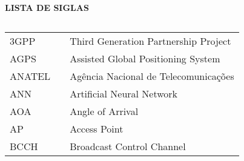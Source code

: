 \newpage

\begin{center}
\textbf{LISTA DE SIGLAS}
\end{center}
$\!$\\

\begin{tabular}{lll}
3GPP & \hspace{1cm} & Third Generation Partnership Project \\
AGPS &  \hspace{1cm} & Assisted Global Positioning System \\
ANATEL &  \hspace{1cm} & Agência Nacional de Telecomunicações \\
ANN & \hspace{1cm} & Artificial Neural Network \\
AOA&  \hspace{1cm} &Angle of Arrival \\
AP&  \hspace{1cm} &Access Point \\
BCCH&  \hspace{1cm} &Broadcast Control Channel \\
\end{tabular}